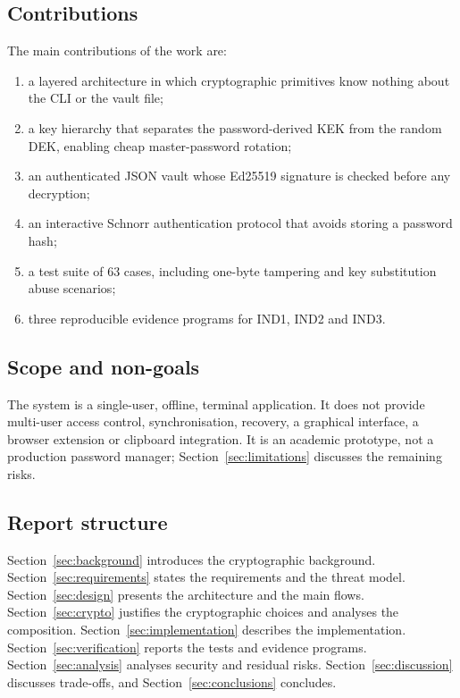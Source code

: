 \documentclass[11pt,a4paper]{article}
\begin{document}
\subsection{Contributions}

The main contributions of the work are:

\begin{enumerate}[leftmargin=*]
  \item a layered architecture in which cryptographic primitives know nothing
        about the CLI or the vault file;
  \item a key hierarchy that separates the password-derived KEK from the random
        DEK, enabling cheap master-password rotation;
  \item an authenticated JSON vault whose Ed25519 signature is checked before
        any decryption;
  \item an interactive Schnorr authentication protocol that avoids storing a
        password hash;
  \item a test suite of 63 cases, including one-byte tampering and key
        substitution abuse scenarios;
  \item three reproducible evidence programs for IND1, IND2 and IND3.
\end{enumerate}

\subsection{Scope and non-goals}

The system is a single-user, offline, terminal application. It does not provide
multi-user access control, synchronisation, recovery, a graphical interface, a
browser extension or clipboard integration. It is an academic prototype, not a
production password manager; Section~\ref{sec:limitations} discusses the
remaining risks.

\subsection{Report structure}

Section~\ref{sec:background} introduces the cryptographic background.
Section~\ref{sec:requirements} states the requirements and the threat model.
Section~\ref{sec:design} presents the architecture and the main flows.
Section~\ref{sec:crypto} justifies the cryptographic choices and analyses the
composition. Section~\ref{sec:implementation} describes the implementation.
Section~\ref{sec:verification} reports the tests and evidence programs.
Section~\ref{sec:analysis} analyses security and residual risks.
Section~\ref{sec:discussion} discusses trade-offs, and
Section~\ref{sec:conclusions} concludes.
\end{document}

